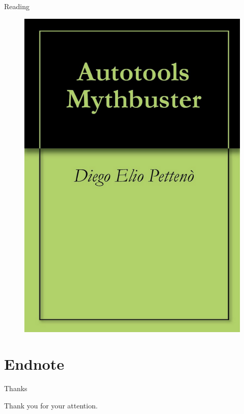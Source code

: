 \documentclass{beamer}
\begin{document}
\begin{frame}{Reading}
    \begin{figure}
    \includegraphics[width= 0.4\linewidth]{mythbuster.png}
    \end{figure}
\end{frame}

\section{Endnote}

\begin{frame}{Thanks}
    \begin{center}
    Thank you for your attention.
    \end{center}
\end{frame}
\end{document}
